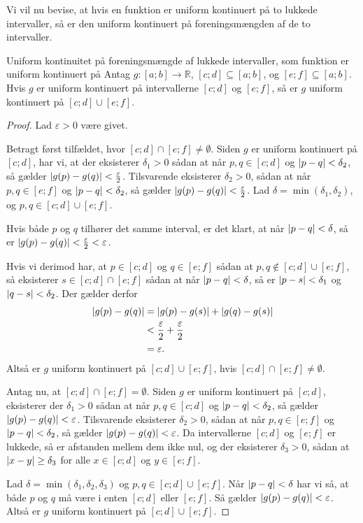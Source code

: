 Vi vil nu bevise, at hvis en funktion er uniform kontinuert på to lukkede intervaller, så er den uniform kontinuert på foreningsmængden af de to intervaller.

\begin{theorem}[label=theo:uniform_fælles]{Uniform kontinuitet på foreningsmængde af lukkede intervaller, som funktion er uniform kontinuert på}{}
  Antag $g:[a;b]\to \mathbb{R}$, $[c;d] \subseteq [a;b]$, og $[e;f]\subseteq [a;b]$.
  Hvis $g$ er uniform kontinuert på intervallerne $[c;d]$ og $[e;f]$, så er $g$ uniform kontinuert på $[c;d] \cup [e;f]$.
\end{theorem}
\begin{proof} 
  Lad $\varepsilon >0$ være givet. 

  Betragt først tilfældet, hvor $[c;d]\cap [e;f]\neq \emptyset $.
  Siden $g$ er uniform kontinuert på $[c;d]$, har vi, at der eksisterer $\delta _1>0$ sådan at når $p, q \in [c;d]$ og $\abs{p-q} <\delta _2$, så gælder $\abs{g(p)-g(q)} < \frac{\varepsilon }{2} $. 
  Tilsvarende eksisterer $\delta _2>0$, sådan at når $p, q \in [e;f]$ og $\abs{p-q} < \delta _2 $, så gælder $\abs{g(p)-g(q)} <\frac{\varepsilon }{2}$. 
  Lad $\delta =\min (\delta _1, \delta _2)$, og $p, q \in [c;d] \cup [e;f]$.

  \noindent Hvis både $p$ og $q$ tilhører det samme interval, er det klart, at når $\abs{p-q}<\delta  $, så er $\abs{g(p)-g(q)} <\frac{\varepsilon }{2} < \varepsilon  $. 

  \noindent Hvis vi derimod har, at $p \in [c;d]$ og $q \in [e;f]$ sådan at $p, q \not\in [c;d] \cup [e;f]$, så eksisterer $s \in [c;d] \cap [e;f]$ sådan at når $\abs{p-q} <\delta $, så er $\abs{p-s} <\delta _1$ og $\abs{q-s} <\delta _2$.
  Der gælder derfor
  \begin{equation*}
  \begin{split}
    \abs{g(p)-g(q)} &= \abs{g(p)-g(s)} + \abs{g(q)-g(s)} \\
  &< \frac{\varepsilon }{2} + \frac{\varepsilon }{2} \\
  &=\varepsilon.
  \end{split}
  \end{equation*}
  Altså er $g$ uniform kontinuert på $[c;d] \cup [e;f]$, hvis $[c;d] \cap [e;f]\neq \emptyset $.

  Antag nu, at $[c;d] \cap [e;f] = \emptyset $.
Siden $g$ er uniform kontinuert på $[c;d]$, eksisterer der $\delta _1>0$ sådan at når $p, q \in [c;d]$ og $\abs{p-q} <\delta _2$, så gælder $\abs{g(p)-g(q)} < \varepsilon$.
Tilsvarende eksisterer $\delta _2>0$, sådan at når $p, q \in [e;f]$ og $\abs{p-q} < \delta _2 $, så gælder $\abs{g(p)-g(q)} <\varepsilon$. 
  Da intervallerne $[c;d]$ og $[e;f]$ er lukkede, så er afstanden mellem dem ikke nul, og der eksisterer $\delta _3>0$, sådan at $\abs{x-y}\geq \delta _3$ for alle $x \in [c;d]$ og $y \in [e;f]$.

  \noindent Lad $\delta = \min (\delta _1, \delta _2, \delta _3)$ og $p, q \in [c;d] \cup [e;f]$.
  Når $\abs{p-q} <\delta $ har vi så, at både $p$ og $q$ må være i enten $[c;d]$ eller $[e;f]$.
  Så gælder $\abs{g(p)-g(q)} <\varepsilon $.
  Altså er $g$ uniform kontinuert på $[c;d] \cup [e;f]$. 
\end{proof}

